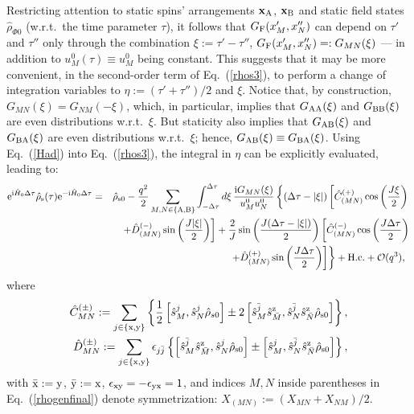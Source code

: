 \documentclass[]{nature}
\begin{document}
Restricting attention to static spins' arrangements $\bf{x}_{\rm A}$, $\bf{x}_{\rm B}$  and  static field states $\hat \rho_{\Phi 0}$ 
(w.r.t.~the time parameter $\tau$), 
it follows that $G_{\rm F}(x_{M}',x_{N}'')$ can depend on $\tau'$ and $\tau''$ only through the combination $\xi := \tau'-\tau''$, $G_{\rm F}(x_{M}',x_{N}'')=:G_{{MN}}(\xi)$ --- in addition to
$u_{M}^0(\tau) \equiv u_{M}^0$ being constant.
This suggests that it may be more convenient, in the 
second-order term of Eq.~(\ref{rhos3}), to perform a change of integration variables to
$\eta:=( \tau'+\tau'')/2$ and $\xi$. 
 Notice that, by construction,  $G_{{MN}}(\xi)=G_{NM}(-\xi)$, which, in particular, implies that
$G_{\rm AA}(\xi)$ and $G_{\rm BB}(\xi)$ are even distributions w.r.t.~$\xi$.  But staticity 
also implies that $G_{\rm AB}(\xi)$ and $G_{\rm BA}(\xi)$ are even distributions w.r.t.\ $\xi$; hence,
$G_{\rm AB}(\xi)\equiv G_{\rm BA}(\xi)$.
Using Eq.~(\ref{Had}) into Eq.~(\ref{rhos3}), the integral in $\eta$ can be 
 explicitly evaluated, leading to:
\begin{eqnarray}
{\rm e}^{{\rm i}\hat H_0 \Delta \tau}\hat \rho_{\rm s}(\tau){\rm e}^{-{\rm i}\hat H_0 \Delta \tau}&=& \hat \rho_{\rm s0} 
-\frac{q^2}{2}
\sum_{
\tiny{{M},{N}\in\{{\rm A},{\rm B}\}}}
\int_{-\Delta \tau}^{\Delta \tau} d\xi\,  \frac{{\rm i} G_{MN}(\xi)}{u_{M}^0 u_{N}^0} 
\left\{
\left(\Delta\tau -|\xi |\right)\left[\hat C^{(+)}_{(MN)}\cos\left(\frac{J\xi}{2}\right)
\right.
\right. \nonumber \\
& &
\left.  +\hat D^{(-)}_{(MN)}\sin\left(\frac{J|\xi |}{2}\right)\right]
 +
\frac{2}{J}\sin\left(\frac{J(\Delta\tau -|\xi |)}{2}\right)\left[\hat C^{(-)}_{(MN)}\cos\left(\frac{J\Delta\tau}{2}\right)
\right.
\nonumber \\
& &\left. \left.
+\hat D^{(+)}_{(MN)}\sin\left(\frac{J\Delta\tau}{2}\right)\right]
\right\}
+{\rm H.c.}
 + {\cal O} (q^3),\;\;
 \label{rhogenfinal}
\end{eqnarray}
where 
\begin{eqnarray}
\hat C^{(\pm)}_{MN} := \sum_{\tiny{{j}\in \{{\rm x},{\rm y}\}}}\left\{\frac{1}{2}\left[\hat s^j_{M},\hat s^j_{N} \hat \rho_{s0}\right]\pm 2\left[\hat s^{\bar j}_M \hat s^{\rm z}_{\bar M},\hat s^{\bar j}_N \hat s^{\rm z}_{\bar N} \hat \rho_{\rm s0}\right] \right\},
\label{Cpm}\\
\hat D^{(\pm)}_{MN} := \sum_{\tiny{j\in \{{\rm x},{\rm y}\}}}\epsilon_{j \bar j}\left\{\left[\hat s^{\bar j}_M \hat s^{\rm z}_{\bar M},\hat s^{j}_N\hat \rho_{\rm s0}\right]\pm \left[\hat s^{j}_M ,\hat s^{\bar j}_N \hat s^{\rm z}_{\bar N} \hat \rho_{\rm s0}\right] \right\},
\label{Dpm}
\end{eqnarray}
with $\bar {\rm x} := {\rm y}$, $\bar {\rm y} := {\rm x}$, $\epsilon_{\rm xy}=-\epsilon_{\rm yx}= 1$, and indices $M,N$ inside
parentheses in Eq.~(\ref{rhogenfinal}) 
denote symmetrization: $X_{(MN)}:= (X_{MN}+X_{NM})/2$. 
\end{document}
